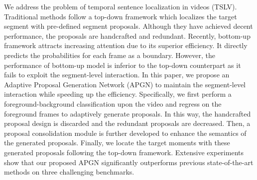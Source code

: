 We address the problem of temporal sentence localization in videos (TSLV). Traditional methods follow a top-down framework which localizes the target segment with pre-defined segment proposals. Although they have achieved decent performance, the proposals are handcrafted and redundant. Recently, bottom-up framework attracts increasing attention due to its superior efficiency. It directly predicts the probabilities for each frame as a boundary. However, the performance of bottom-up model is inferior to the top-down counterpart as it fails to exploit the segment-level interaction. In this paper, we propose an Adaptive Proposal Generation Network (APGN) to maintain the segment-level interaction while speeding up the efficiency. Specifically, we first perform a foreground-background classification upon the video and regress on the foreground frames to adaptively generate proposals. In this way, the handcrafted proposal design is discarded and the redundant proposals are decreased. Then, a proposal consolidation module is further developed to enhance the semantics of the generated proposals. Finally, we locate the target moments with these generated proposals following the top-down framework. Extensive experiments show that our proposed APGN significantly outperforms previous state-of-the-art methods on three challenging benchmarks.
